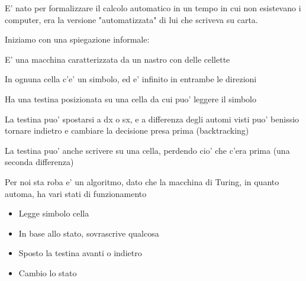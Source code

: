 E' nato per formalizzare il calcolo automatico in un tempo in cui non esistevano i computer, era la versione "automatizzata" di lui che scriveva su carta.

Iniziamo con una spiegazione informale:

E' una macchina caratterizzata da un nastro con delle cellette

In ognuna cella c'e' un simbolo, ed e' infinito in entrambe le direzioni

Ha una testina posizionata su una cella da cui puo' leggere il simbolo

La testina puo' spostarsi a dx o sx, e a differenza degli automi visti puo' benissio tornare indietro e cambiare la decisione presa prima (backtracking)

La testina puo' anche scrivere su una cella, perdendo cio' che c'era prima (una seconda differenza)

Per noi sta roba e' un algoritmo, dato che la macchina di Turing, in quanto automa, ha vari stati di funzionamento
\begin{itemize}
\item Legge simbolo cella
\item In base allo stato, sovrascrive qualcosa
\item Sposto la testina avanti o indietro
\item Cambio lo stato
\end{itemize}


